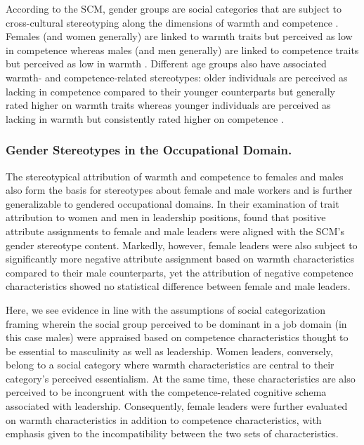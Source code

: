 \documentclass[jou]{apa7}
\begin{document}
According to the SCM, gender groups are social categories that are subject to cross-cultural stereotyping along the dimensions of warmth and competence \parencite{fiskeModelOftenMixed2002}. Females (and women generally) are linked to warmth traits but perceived as low in competence whereas males (and men generally) are linked to competence traits but perceived as low in warmth \parencite{Eagly1997,suhGenderRelationshipsInfluences2004}. Different age groups also have associated warmth- and competence-related stereotypes: older individuals are perceived as lacking in competence compared to their younger counterparts but generally rated higher on warmth traits whereas younger individuals are perceived as lacking in warmth but consistently rated higher on competence \parencite{cuddyThisOldStereotype2005,vanselmSearchOlderWorker2021}.

\subsubsection{Gender Stereotypes in the Occupational Domain.}
\label{gender_stereotypes_in_the_occupational_domain}
The stereotypical attribution of warmth and competence to females and males also form the basis for stereotypes about female and male workers \parencite{froehlichGenderWorkNations2020} and is further generalizable to gendered occupational domains. In their examination of trait attribution to women and men in leadership positions, \textcite{smithPowerLanguageGender2019} found that positive attribute assignments to female and male leaders were aligned with the SCM’s gender stereotype content. Markedly, however, female leaders were also subject to significantly more negative attribute assignment based on warmth characteristics compared to their male counterparts, yet the attribution of negative competence characteristics showed no statistical difference between female and male leaders.

Here, we see evidence in line with the assumptions of social categorization framing wherein the social group perceived to be dominant in a job domain (in this case males) were appraised based on competence characteristics thought to be essential to masculinity as well as leadership. Women leaders, conversely, belong to a social category where warmth characteristics are central to their category’s perceived essentialism. At the same time, these characteristics are also perceived to be incongruent with the competence-related cognitive schema associated with leadership. Consequently, female leaders were further evaluated on warmth characteristics in addition to competence characteristics, with emphasis given to the incompatibility between the two sets of characteristics.
\end{document}
